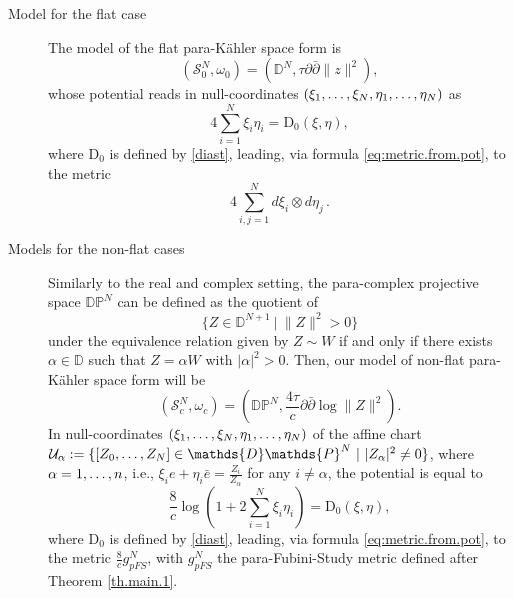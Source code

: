 \documentclass[11pt, reqno]{amsart}
\newcommand{\DP}{\mathds{D}\mathds{P}}
\newcommand{\s}{\mathcal{S}}
\newcommand{\de}{\partial}
\newcommand{\dd}{\mathrm{D}}
\newcommand{\D}{\mathds{D}}
\newcommand{\pk }{para-K\"{a}hler }
\begin{document}
\begin{description}
\item[Model for the flat case] The model of the flat \pk space form is
\begin{equation*}%
\left(\s_0^N,\omega_0\right)=\left(\D^N,{\tau}\de\bar\de \|z\|^2\right),
\end{equation*}
whose potential reads in null-coordinates $(\xi_1,\mathellipsis, \xi_N,\eta_1,\mathellipsis,\eta_N)$ as 
\begin{equation*}\label{dn}
 4\sum_{i=1}^N \xi_i\eta_i =\dd_0(\xi,\eta), 
\end{equation*}
where $\dd_0$ is defined by \eqref{diast}, leading, via formula \eqref{eq:metric.from.pot}, to the metric
$$ 4 \sum_{i,j=1}^N d\xi_i\otimes d \eta_j\,.$$


\smallskip
\item[Models for the non-flat cases]
Similarly to the real and complex setting, the para-complex projective space $\DP^N$ can be defined as the quotient of
$$\{Z\in\D^{N+1} \ |\ \|Z\|^2>0\}$$
under the equivalence relation given by
$Z\sim W$ if and only if there exists $\alpha\in\D$ such that $Z=\alpha W$ with $|\alpha|^2>0$. Then, our model of non-flat \pk space form will be
\begin{equation*}
(\s_c^N,\omega_c)=\left(\DP^N,\frac{4\tau}{c}\de\bar\de\log \|Z\|^2 \right).
\end{equation*}
In null-coordinates  $(\xi_1,\mathellipsis, \xi_N,\eta_1,\mathellipsis,\eta_N)$ of the affine chart $\mathcal{U}_\alpha:=\{[Z_0,\mathellipsis,Z_N]\in \DP^N \ |\ |Z_\alpha|^2\neq 0\}$, where $\alpha=1,\mathellipsis,n$, i.e., $\xi_i e+\eta_i \bar e= \frac{Z_i}{Z_\alpha}$ for any $i\neq \alpha$, the potential is equal to 
\begin{equation}\label{dpn}
\frac{8}{c}\log\left( 1+2\sum_{i=1}^N \xi_i\eta_i\right)=\dd_0(\xi,\eta),
\end{equation}
where $\dd_0$ is defined by \eqref{diast}, leading, via formula \eqref{eq:metric.from.pot}, to  the metric $\frac{8}{c} g_{pFS}^N$, with $g_{pFS}^N$ the para-Fubini-Study metric defined after Theorem \ref{th.main.1}.
\end{description}
\end{document}

